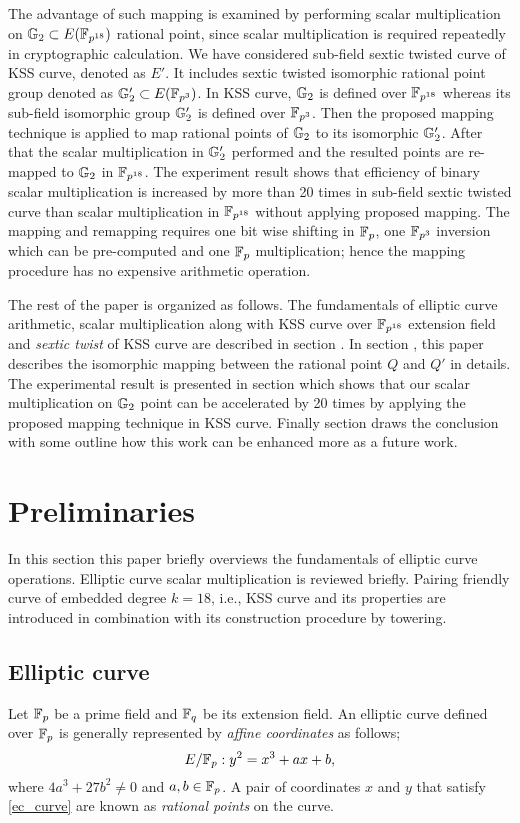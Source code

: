         The advantage of such mapping is examined by performing scalar multiplication on ${\mathbb{G}}_{2} \subset E(\mathbb{F}_{p^{18}})$ rational point, since scalar multiplication is required repeatedly in cryptographic calculation. 
        We have considered sub-field sextic twisted curve of KSS curve, denoted as $E'$. It includes sextic twisted isomorphic rational point group denoted as ${\mathbb{G}}_{2}' \subset E(\mathbb{F}_{p^3})$. In KSS curve, ${\mathbb{G}}_{2}$ is defined over $\mathbb{F}_{p^{18}}$ whereas its sub-field isomorphic group ${\mathbb{G}}_{2}'$ is defined over $\mathbb{F}_{p^3}$. Then the proposed mapping technique is applied to map rational points of ${\mathbb{G}}_{2}$ to its isomorphic ${\mathbb{G}}_{2}'$. After that the scalar multiplication in ${\mathbb{G}}_{2}'$ performed and the resulted points are re-mapped to ${\mathbb{G}}_{2}$ in $\mathbb{F}_{p^{18}}$.
        The experiment result shows  that efficiency of binary scalar multiplication is increased by more than 20 times in sub-field sextic twisted curve than scalar multiplication in $\mathbb{F}_{p^{18}}$ without applying proposed mapping. The mapping and remapping requires one bit wise shifting in ${\mathbb{F}}_{p}$, one $\mathbb{F}_{p^3}$ inversion which can be pre-computed and one ${\mathbb{F}}_{p}$ multiplication; hence the mapping procedure has no expensive arithmetic operation.
        
        The rest of the paper is organized as follows. 
        The fundamentals of elliptic curve arithmetic, scalar multiplication along with KSS curve over $\mathbb{F}_{p^{18}}$ extension field and \textit{sextic twist} of KSS curve are described in section .
        In section , this paper describes the isomorphic mapping between the rational point $Q$ and $Q'$ in details. The experimental result is presented in section  which shows that our scalar multiplication on ${\mathbb{G}}_{2}$ point can be accelerated by 20 times by applying the proposed mapping technique in KSS curve. Finally section  draws the conclusion with some outline how this work can be enhanced more as a future work.
        
        \section{Preliminaries}
        In this section this paper briefly overviews the fundamentals of elliptic curve operations. Elliptic curve scalar multiplication is reviewed briefly. Pairing friendly curve of embedded degree $k=18$, i.e., KSS curve and its properties are introduced in combination  with its construction procedure by towering.
        \subsection{Elliptic curve}
        Let ${\mathbb{F}}_{p}$ be a prime field and ${\mathbb{F}}_{q}$ be its extension field. An elliptic curve \cite{ecc_book} defined over ${\mathbb{F}}_{p}$ is generally represented by \textit{affine coordinates} \cite{Silverman} as follows;
        \begin{equation}\label{ec_curve}
        E/{\mathbb{F}}_{p} : y^2=x^3+ax+b,
        \end{equation}
        where $ 4a^3+27b^2 \neq 0$ and $a,b \in {\mathbb{F}}_{p}$. A pair of coordinates $x$ and $y$ that satisfy \eqref{ec_curve} are known as \textit{rational points} on the curve. 
        
